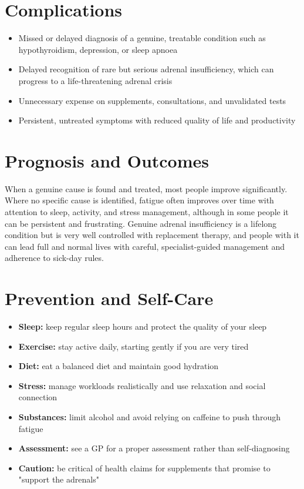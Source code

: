 \section*{Complications}
\begin{itemize}
    \item Missed or delayed diagnosis of a genuine, treatable condition such as hypothyroidism, depression, or sleep apnoea
    \item Delayed recognition of rare but serious adrenal insufficiency, which can progress to a life-threatening adrenal crisis
    \item Unnecessary expense on supplements, consultations, and unvalidated tests
    \item Persistent, untreated symptoms with reduced quality of life and productivity
\end{itemize}

\section*{Prognosis and Outcomes}
When a genuine cause is found and treated, most people improve significantly. Where no specific cause is identified, fatigue often improves over time with attention to sleep, activity, and stress management, although in some people it can be persistent and frustrating. Genuine adrenal insufficiency is a lifelong condition but is very well controlled with replacement therapy, and people with it can lead full and normal lives with careful, specialist-guided management and adherence to sick-day rules.

\section*{Prevention and Self-Care}
\begin{itemize}
    \item \textbf{Sleep:} keep regular sleep hours and protect the quality of your sleep
    \item \textbf{Exercise:} stay active daily, starting gently if you are very tired
    \item \textbf{Diet:} eat a balanced diet and maintain good hydration
    \item \textbf{Stress:} manage workloads realistically and use relaxation and social connection
    \item \textbf{Substances:} limit alcohol and avoid relying on caffeine to push through fatigue
    \item \textbf{Assessment:} see a GP for a proper assessment rather than self-diagnosing
    \item \textbf{Caution:} be critical of health claims for supplements that promise to "support the adrenals"
\end{itemize}

